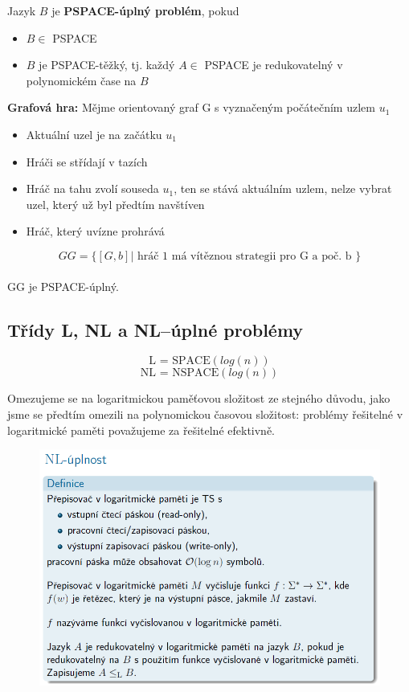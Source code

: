 \documentclass[10pt,a4paper]{article}
\theoremstyle{note}
\begin{document}
		Jazyk $B$ je \textbf{PSPACE-úplný problém}, pokud
		\begin{itemize}
			\item $B \in$ PSPACE
			\item $B$ je PSPACE-těžký, tj. každý $A \in$ PSPACE je redukovatelný v polynomickém čase na $B$
		\end{itemize}\vspace{3mm}
		\textbf{Grafová hra:} Mějme orientovaný graf G s vyznačeným počátečním uzlem $u_1$
		\begin{itemize}
			\item Aktuální uzel je na začátku $u_1$
			\item Hráči se střídají v tazích
			\item Hráč na tahu zvolí souseda $u_1$, ten se stává aktuálním uzlem, nelze vybrat uzel, který už byl předtím
				navštíven
			\item Hráč, který uvízne prohrává
		\end{itemize}
		$$GG = \{[G,b] | \text{ hráč 1 má vítěznou strategii pro G a poč. b } \}$$\\

		GG je PSPACE-úplný.



	\subsection{Třídy L, NL a NL--úplné problémy}

		$$\text{L = SPACE}(log(n))$$
		$$\text{NL = NSPACE}(log(n))$$

	Omezujeme se na logaritmickou paměťovou složitost ze stejného důvodu, jako jsme se předtím omezili na
	 polynomickou časovou složitost: problémy řešitelné v logaritmické paměti považujeme za řešitelné efektivně.

		\begin{figure}[!h]
		\centering
		\includegraphics[width=13cm]{img/prepisovac.png}
		\end{figure}
\end{document}
